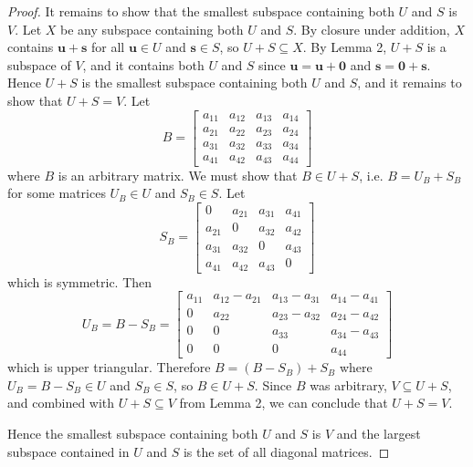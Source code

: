 \documentclass{article}
\begin{document}
\begin{proof}
    \medskip

    It remains to show that the smallest subspace containing both $U$ and $S$ is $V$. Let $X$ be any subspace 
    containing both $U$ and $S$. By closure under addition, $X$ contains $\mathbf{u} + \mathbf{s}$ for all 
    $\mathbf{u} \in U$ and $\mathbf{s} \in S$, so $U + S \subseteq X$. By Lemma 2, $U + S$ is a subspace of $V$, 
    and it contains both $U$ and $S$ since 
    $\mathbf{u} = \mathbf{u} + \mathbf{0}$ and $\mathbf{s} = \mathbf{0} + \mathbf{s}$. Hence $U + S$ is the 
    smallest subspace containing both $U$ and $S$, and it remains to show that $U + S = V$. Let
    \[
    B = \begin{bmatrix}
        a_{11} & a_{12} & a_{13} & a_{14} \\
        a_{21} & a_{22} & a_{23} & a_{24} \\
        a_{31} & a_{32} & a_{33} & a_{34} \\
        a_{41} & a_{42} & a_{43} & a_{44}
    \end{bmatrix}
    \]
    where $B$ is an arbitrary matrix. We must show that $B \in U + S$, i.e. $B = U_B + S_B$ for some matrices 
    $U_B \in U$ and $S_B \in S$. Let 
    \[
    S_B = \begin{bmatrix}
        0 & a_{21} & a_{31} & a_{41} \\
        a_{21} & 0 & a_{32} & a_{42} \\
        a_{31} & a_{32} & 0 & a_{43} \\
        a_{41} & a_{42} & a_{43} & 0
    \end{bmatrix}
    \]
    which is symmetric. Then 
    \[
    U_B = B - S_B = \begin{bmatrix}
        a_{11} & a_{12} - a_{21} & a_{13} - a_{31} & a_{14} - a_{41} \\
        0 & a_{22} & a_{23} - a_{32} & a_{24} - a_{42} \\
        0 & 0 & a_{33} & a_{34} - a_{43} \\
        0 & 0 & 0 & a_{44}
    \end{bmatrix}
    \]
    which is upper triangular. Therefore $B = (B - S_B) + S_B$ where $U_B = B - S_B \in U$ and $S_B \in S$, so 
    $B \in U + S$. Since $B$ was arbitrary, $V \subseteq U + S$, and combined with $U + S \subseteq V$ from 
    Lemma 2, we can conclude that $U + S = V$.

    \medskip

    Hence the smallest subspace containing both $U$ and $S$ is $V$ and the largest subspace contained in $U$ 
    and $S$ is the set of all diagonal matrices.
\end{proof}
\end{document}
